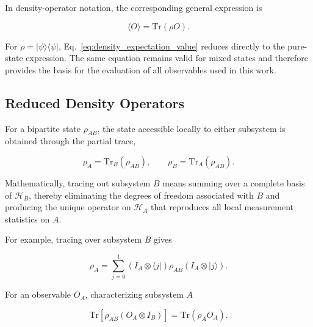 In density-operator notation, the corresponding general expression is

\begin{equation}
\langle O\rangle
=
\mathrm{Tr}(\rho O).
\label{eq:density_expectation_value}
\end{equation}

For \( \rho=|\psi\rangle\langle\psi| \), Eq.~\eqref{eq:density_expectation_value}
reduces directly to the pure-state expression. The same equation remains valid for
mixed states and therefore provides the basis for the evaluation of all observables
used in this work.


\subsection{Reduced Density Operators}
\label{subsec:reduced_density_operators}

For a bipartite state \( \rho_{AB} \), the state accessible locally to either
subsystem is obtained through the partial trace,

\begin{equation}
\rho_A
=
\mathrm{Tr}_B(\rho_{AB}),
\qquad
\rho_B
=
\mathrm{Tr}_A(\rho_{AB}).
\label{eq:reduced_density_operator_definition}
\end{equation}

Mathematically, tracing out subsystem \(B\) means summing over a complete basis of
\(\mathcal{H}_B\), thereby eliminating the degrees of freedom associated with \(B\)
and producing the unique operator on \(\mathcal{H}_A\) that reproduces all local
measurement statistics on \(A\).

For example, tracing over subsystem \(B\) gives

\begin{equation}
\rho_A
=
\sum_{j=0}^{1}
\left(
I_A\otimes\langle j|
\right)
\rho_{AB}
\left(
I_A\otimes|j\rangle
\right).
\label{eq:partial_trace_expression}
\end{equation}

For an observable \(O_A\), characterizing subsystem \(A\)

\begin{equation}
\mathrm{Tr}
\left[
\rho_{AB}
\left(
O_A\otimes I_B
\right)
\right]
=
\mathrm{Tr}(\rho_A O_A).
\label{eq:local_expectation_reduced_state}
\end{equation}

